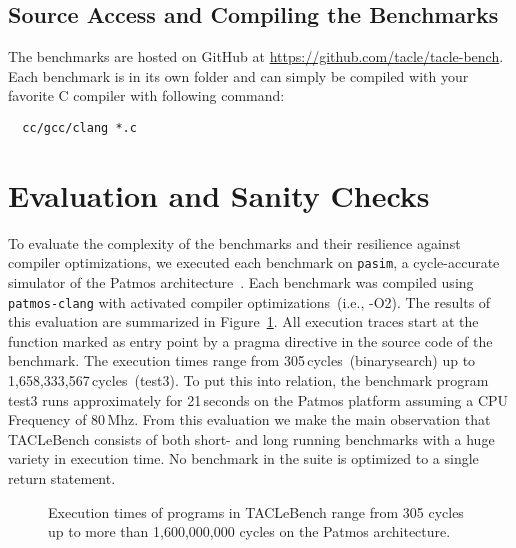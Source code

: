 \documentclass[a4paper,UKenglish]{oasics}
\begin{document}
\subsection{Source Access and Compiling the Benchmarks}

The benchmarks are hosted on GitHub at \url{https://github.com/tacle/tacle-bench}.
Each benchmark is in its own folder and can simply be compiled with your favorite
C compiler with following command:

\begin{verbatim}
  cc/gcc/clang *.c
\end{verbatim}


\section{Evaluation and Sanity Checks}
\label{sec:eval}
To evaluate the complexity of the benchmarks and their resilience against 
compiler optimizations, we executed each benchmark on \texttt{pasim}, a 
cycle-accurate simulator of the Patmos architecture~\cite{t-crest:2015}. Each 
benchmark was compiled using \texttt{patmos-clang} with activated compiler 
optimizations~(i.e., -O2). The results of this evaluation are summarized in 
Figure~\ref{fig:execution-times}. All execution traces start at the function 
marked as entry point by a pragma directive in the source code of the benchmark.
The execution times range from 305\,cycles~(binarysearch) up to 
1,658,333,567\,cycles~(test3).
To put this into relation, the benchmark program test3 runs approximately 
for 21\,seconds on the Patmos platform assuming a CPU Frequency of 80\,Mhz.
From this evaluation we make the main observation that 
TACLeBench consists of both short- and long running benchmarks with a huge variety in execution time. 
No benchmark in the suite is optimized to a single return statement.

\begin{figure}[t]
  \def\resultfile{eval/wcet.csv}
  
  \caption{Execution times of programs in TACLeBench range from 305 cycles up to more than 1,600,000,000 cycles on the Patmos architecture.}
  \label{fig:execution-times}
\end{figure}
\end{document}
